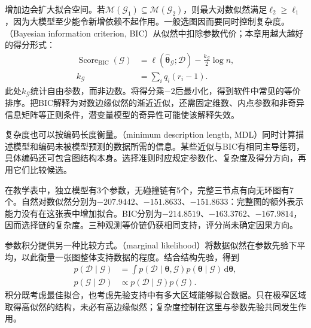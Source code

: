 增加边会扩大拟合空间。若$\mathcal{M}(\mathcal{G}_1)\subseteq\mathcal{M}(\mathcal{G}_2)$，则最大对数似然满足$\ell_2\geq\ell_1$，因为大模型至少能令新增依赖不起作用。一般选图因而要同时控制复杂度。（Bayesian information criterion, BIC）从似然中扣除参数代价；本章用越大越好的得分形式：
\begin{equation}
  \begin{aligned}
    \operatorname{Score}_{\mathrm{BIC}}(\mathcal{G})
      &=\ell(\widehat{\bm{\theta}}_{\mathcal{G}};\mathcal{D})
        -\frac{k_{\mathcal{G}}}{2}\log n,\\
    k_{\mathcal{G}}&=\sum_iq_i(r_i-1).
  \end{aligned}
  \label{eq:pgm-structure-learning-bic}
\end{equation}
此处$k_{\mathcal{G}}$统计自由参数，而非边数。将得分乘$-2$后最小化，得到软件中常见的等价排序。把BIC解释为对数边缘似然的渐近近似，还需固定维数、内点参数和非奇异信息矩阵等正则条件，潜变量模型的奇异性可能使该解释失效。

复杂度也可以按编码长度衡量。（minimum description length, MDL）同时计算描述模型和编码未被模型预测的数据所需的信息。某些近似与BIC有相同主导惩罚，具体编码还可包含图结构本身。选择准则时应规定参数化、复杂度及得分方向，再用它们比较候选。

在教学表中，独立模型有3个参数，无碰撞链有5个，完整三节点有向无环图有7个。自然对数似然分别为$-207.9442$、$-151.8633$、$-151.8633$：完整图的额外表示能力没有在这张表中增加拟合。BIC分别为$-214.8519$、$-163.3762$、$-167.9814$，因而选择链的复杂度。三种观测等价链仍获相同支持，评分尚未确定因果方向。

参数积分提供另一种比较方式。（marginal likelihood）将数据似然在参数先验下平均，以此衡量一张图整体支持数据的程度。结合结构先验，得到
\begin{equation}
  \begin{aligned}
    p(\mathcal{D}\mid\mathcal{G})
      &=\int p(\mathcal{D}\mid\bm{\theta},\mathcal{G})
              p(\bm{\theta}\mid\mathcal{G})\,\mathrm{d}\bm{\theta},\\
    p(\mathcal{G}\mid\mathcal{D})
      &\propto p(\mathcal{D}\mid\mathcal{G})p(\mathcal{G}).
  \end{aligned}
  \label{eq:pgm-structure-learning-posterior}
\end{equation}
积分既考虑最佳拟合，也考虑先验支持中有多大区域能够拟合数据。只在极窄区域取得高似然的结构，未必有高边缘似然；复杂度控制在这里与参数先验共同发生作用。

